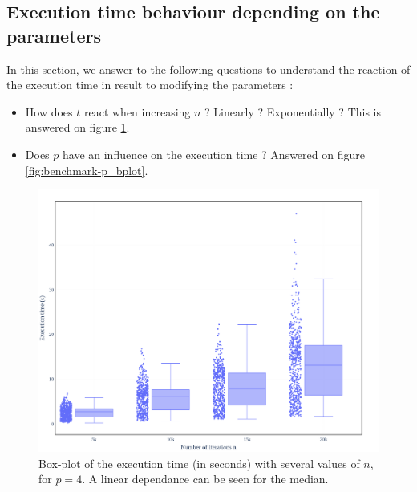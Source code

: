 \subsection{Execution time behaviour depending on the parameters}
In this section, we answer to the following questions to understand the reaction of the execution time in result to modifying the parameters :
\begin{itemize}[label=$\blacktriangleright$]
    \item How does $t$ react when increasing $n$ ? Linearly ? Exponentially ? This is answered on figure \ref{fig:benchmark-n_bplot}.
    \item Does $p$ have an influence on the execution time ? Answered on figure \ref{fig:benchmark-p_bplot}.
\end{itemize}
\begin{figure}[h]
    \centering
    \includegraphics[width=\linewidth]{n_box_plot.png}
    \caption{Box-plot of the execution time (in seconds) with several values of $n$, for $p=4$. A linear dependance can be seen for the median.}
    \label{fig:benchmark-n_bplot}
\end{figure}
